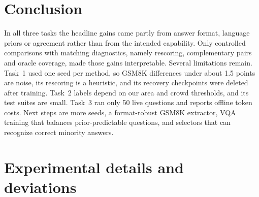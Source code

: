 \documentclass{article}
\begin{document}
\section{Conclusion}
In all three tasks the headline gains came partly from answer format, language priors or agreement rather than from the intended capability. Only controlled comparisons with matching diagnostics, namely rescoring, complementary pairs and oracle coverage, made those gains interpretable. Several limitations remain. Task~1 used one seed per method, so GSM8K differences under about 1.5 points are noise, its rescoring is a heuristic, and its recovery checkpoints were deleted after training. Task~2 labels depend on our area and crowd thresholds, and its test suites are small. Task~3 ran only 50 live questions and reports offline token costs. Next steps are more seeds, a format-robust GSM8K extractor, VQA training that balances prior-predictable questions, and selectors that can recognize correct minority answers.




\newpage
\appendix
{}

\section{Experimental details and deviations}\label{app:details}
\end{document}
